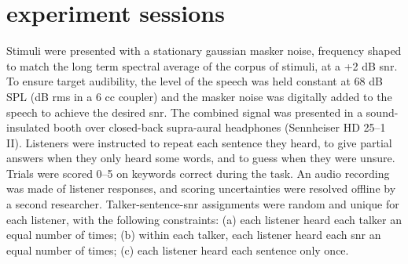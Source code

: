 \section{experiment sessions}

Stimuli were presented with a stationary gaussian masker noise, frequency shaped to match the long term spectral average of the corpus of stimuli, at a +2 dB \ac{snr}.  To ensure target audibility, the level of the speech was held constant at 68 dB SPL (dB \ac{rms} in a 6 cc coupler) and the masker noise was digitally added to the speech to achieve the desired \ac{snr}.  The combined signal was presented in a sound-insulated booth over closed-back supra-aural headphones (Sennheiser HD 25–1 II).  Listeners were instructed to repeat each sentence they heard, to give partial answers when they only heard some words, and to guess when they were unsure.  Trials were scored 0–5 on keywords correct during the task.  An audio recording was made of listener responses, and scoring uncertainties were resolved offline by a second researcher.  Talker-sentence-\ac{snr} assignments were random and unique for each listener, with the following constraints: (a) each listener heard each talker an equal number of times; (b) within each talker, each listener heard each \ac{snr} an equal number of times; (c) each listener heard each sentence only once.

